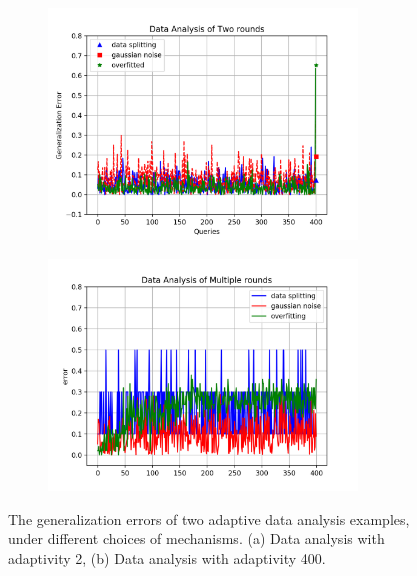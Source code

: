 {\small
\begin{figure}
\centering
\begin{subfigure}{.48\textwidth}
\begin{centering}
\includegraphics[width=0.9\textwidth]{figures/tworound.png}
\caption{}
\end{centering}
\end{subfigure}
\quad
\begin{subfigure}{.48\textwidth}
\begin{centering}
\includegraphics[width=0.9\textwidth]{figures/multipleround.png}
\caption{}
\end{centering}
\end{subfigure}
\vspace{-0.4cm}
 \caption{
 The generalization errors of two adaptive data analysis examples, under different choices of mechanisms.
 (a) Data analysis with adaptivity 2, 
 (b) Data analysis with adaptivity 400. 
}
\label{fig:generalization_errors}
\vspace{-0.5cm}
\end{figure}
}
